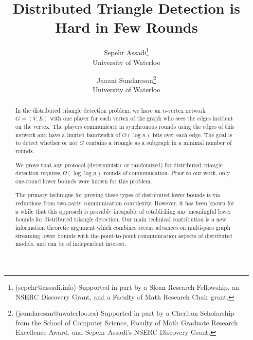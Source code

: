 \documentclass[11pt]{article}
\title{Distributed Triangle Detection is Hard in Few Rounds}
\author{Sepehr Assadi\footnote{(sepehr@assadi.info) Supported in part by a  Sloan Research Fellowship, an NSERC
Discovery Grant, and a Faculty of Math Research Chair grant. \smallskip} 
\\ {\small University of Waterloo} \and
Janani Sundaresan\footnote{(jsundaresan@uwaterloo.ca) Supported in part by a Cheriton Scholarship from the School of Computer Science, Faculty of Math Graduate Research Excellence Award, and Sepehr Assadi's NSERC Discovery Grant. \smallskip} \\ {\small University of Waterloo}
}
\date{}
\theoremstyle{definition}
\begin{document}
\maketitle


\begin{abstract}

\medskip

In the distributed triangle detection problem, we have an $n$-vertex network $G=(V,E)$ with one player for each vertex of the graph who sees the edges incident on the vertex. The players communicate in synchronous rounds using the 
edges of this network and have a limited bandwidth of $O(\log{n})$ bits over each edge. The goal is to detect whether or not $G$ contains a triangle as a subgraph in a minimal number of rounds. 

\medskip

We prove that any protocol (deterministic or randomized) for distributed triangle detection requires $\Omega(\log\log{n})$ rounds of communication. Prior to our work, only 
one-round lower bounds were known for this problem. 

\medskip

The primary technique for proving these types of distributed lower bounds is via reductions from two-party communication complexity. However, it has been known for a while that this approach is provably incapable of establishing 
any meaningful lower bounds for distributed triangle detection. Our main technical contribution is a new information theoretic argument which combines recent advances on multi-pass graph streaming lower bounds 
with the point-to-point communication aspects of distributed models, and can be of independent interest. 



\end{abstract}




\clearpage


\setcounter{tocdepth}{3}
\tableofcontents
\clearpage
{}
\setcounter{page}{1}

%

\end{document}

